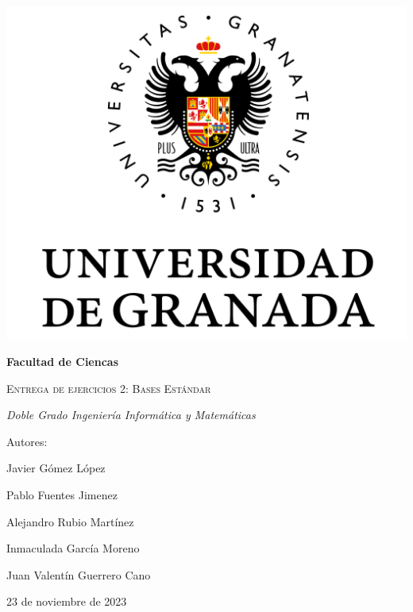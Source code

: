 \documentclass[10pt,a4paper]{article}
\begin{document}
	
\begin{titlepage}
	\centering
	{\includegraphics[scale=0.5]{Logo_UGR.png}\par}
	\vspace{1cm}
	{\bfseries\Large Facultad de Ciencas \par}
	\vspace{2.5cm}
	{\scshape\Huge Entrega de ejercicios 2: Bases Estándar\par}
	\vspace{3cm}
	{\itshape\Large Doble Grado Ingeniería Informática y Matemáticas}
	\vfill
	{\Large Autores: \par}
	{\Large Javier Gómez López \par}
	{\Large Pablo Fuentes Jimenez \par}
	{\Large Alejandro Rubio Martínez \par}
	{\Large Inmaculada García Moreno \par}
	{\Large Juan Valentín Guerrero Cano \par}
	
	\vfill
	{\Large 23 de noviembre de 2023 \par}
\end{titlepage}

\thispagestyle{empty}
\null
\vfill
\end{document}
